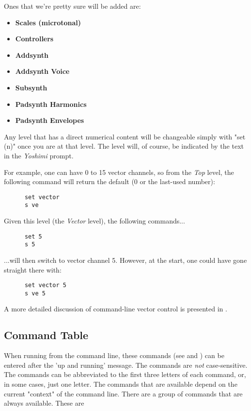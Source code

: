 Ones that we're pretty sure will be added are:

   \begin{itemize}
      \item \textbf{Scales (microtonal)}
      \item \textbf{Controllers}
      \item \textbf{Addsynth}
      \item \textbf{Addsynth Voice}
      \item \textbf{Subsynth}
      \item \textbf{Padsynth Harmonics}
      \item \textbf{Padsynth Envelopes}
   \end{itemize}

   Any level that has a direct numerical content will be changeable simply with
   "set (n)" once you are at that level.  The level will, of course, be
   indicated by the text in the \textsl{Yoshimi} prompt.

   For example, one can have 0 to 15 vector channels, so from the
   \textsl{Top} level, the following command
   will return the default  (0 or the last-used number):

   \begin{verbatim}
      set vector
      s ve
   \end{verbatim}

   Given this level (the \textsl{Vector} level), the following commands...

   \begin{verbatim}
      set 5 
      s 5
   \end{verbatim}

   ...will then switch to vector channel 5.
   However, at the start, one could have gone straight there with:

   \begin{verbatim}
      set vector 5
      s ve 5
   \end{verbatim}

   A more detailed discussion of command-line vector control is presented in
   .

\subsection{Command Table}
\label{subsec:command_line_command_table}

   When running from the command line, these commands
   (see 
   and )
   can be entered after the 'up and running' message.
   The commands are \textsl{not} case-sensitive.
   The commands can be abbreviated to the first three letters of each command,
   or, in some cases, just one letter.
   The commands that are available depend on the current "context" of the
   command line.
   There are a group of commands that are always available. These are

